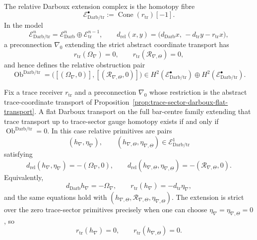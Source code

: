 \begin{defn}
The relative Darboux extension complex is the homotopy fibre
\[
  \mathcal E^\bullet_{\mathrm{Darb}/\mathrm{tr}}
  :=
  \operatorname{Cone}(r_{\mathrm{tr}})[-1].
\]
In the model
\[
  \mathcal E^n_{\mathrm{Darb}/\mathrm{tr}}
  =
  \mathcal E^n_{\mathrm{Darb}}
  \oplus
  \mathcal E^{n-1}_{\mathrm{tr}},
  \qquad
  d_{\mathrm{rel}}(x,y)
  =
  \bigl(d_{\mathrm{Darb}}x,\,-d_{\mathrm{tr}}y-r_{\mathrm{tr}}x\bigr),
\]
a preconnection \(\nabla_0\) extending the strict abstract coordinate
transport has
\[
  r_{\mathrm{tr}}(\Omega_\nabla)=0,\qquad
  r_{\mathrm{tr}}(\mathcal R_{\nabla,\Theta})=0,
\]
and hence defines the relative obstruction pair
\[
  \operatorname{Ob}^{\mathrm{Darb}/\mathrm{tr}}
  =
  \bigl([(\Omega_\nabla,0)],
        [(\mathcal R_{\nabla,\Theta},0)]\bigr)
  \in
  H^2(\mathcal E^\bullet_{\mathrm{Darb}/\mathrm{tr}})
  \oplus
  H^2(\mathcal E^\bullet_{\mathrm{Darb}/\mathrm{tr}}).
\]
\end{defn}

\begin{prop}
\label{prop:relative-darboux-extension-criterion}
Fix a trace receiver \(r_{\mathrm{tr}}\) and a preconnection
\(\nabla_0\) whose restriction is the abstract trace-coordinate
transport of
Proposition~\ref{prop:trace-sector-darboux-flat-transport}.  A flat
Darboux transport on the full bar-centre family extending that trace
transport up to trace-sector gauge homotopy exists if and only if
\(\operatorname{Ob}^{\mathrm{Darb}/\mathrm{tr}}=0\).  In this case
relative primitives are pairs
\[
  (h_\nabla,\eta_\nabla),\qquad
  (h_{\nabla,\Theta},\eta_{\nabla,\Theta})
  \in\mathcal E^1_{\mathrm{Darb}/\mathrm{tr}}
\]
satisfying
\[
  d_{\mathrm{rel}}(h_\nabla,\eta_\nabla)
  =
  -(\Omega_\nabla,0),
  \qquad
  d_{\mathrm{rel}}(h_{\nabla,\Theta},\eta_{\nabla,\Theta})
  =
  -(\mathcal R_{\nabla,\Theta},0).
\]
Equivalently,
\[
  d_{\mathrm{Darb}}h_\nabla=-\Omega_\nabla,\qquad
  r_{\mathrm{tr}}(h_\nabla)=-d_{\mathrm{tr}}\eta_\nabla,
\]
and the same equations hold with
\((h_{\nabla,\Theta},\mathcal R_{\nabla,\Theta},
\eta_{\nabla,\Theta})\).  The extension is strict over the zero
trace-sector primitives precisely when one can choose
\(\eta_\nabla=\eta_{\nabla,\Theta}=0\), so
\[
  r_{\mathrm{tr}}(h_\nabla)=0,\qquad
  r_{\mathrm{tr}}(h_{\nabla,\Theta})=0.
\]
\end{prop}

